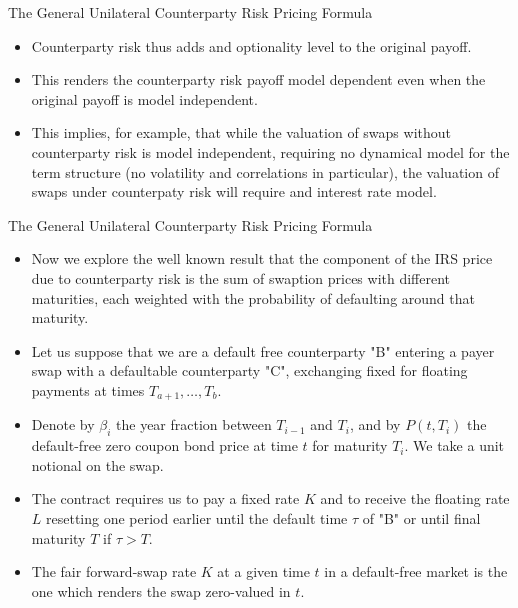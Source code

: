 \documentclass[11pt]{beamer}
\begin{document}
\begin{frame}{The General Unilateral Counterparty Risk Pricing Formula}
\begin{itemize}
\item Counterparty risk thus adds and optionality level to the original payoff. 
\item This renders the counterparty risk payoff model dependent even when the original payoff is model independent. \item This implies, for example, that while the valuation of swaps without counterparty risk is model independent, requiring no dynamical model for the term structure (no volatility and correlations in particular), the valuation of swaps under counterpaty risk will require and interest rate model. 
\end{itemize}
\end{frame}
\begin{frame}{The General Unilateral Counterparty Risk Pricing Formula}
\begin{itemize}
\item Now we explore the well known result that the component of the IRS price due to counterparty risk is the sum of swaption prices with different maturities, each weighted with the probability of defaulting around that maturity. 
\item Let us suppose that we are a default free counterparty "B" entering a payer swap with a defaultable counterparty "C", exchanging fixed for floating payments at times $T_{a+1},\dots,T_b$. 
\item Denote by $\beta_i$ the year fraction between $T_{i-1}$ and $T_i$, and by $P(t, T_i)$ the default-free zero coupon bond price at time $t$ for maturity $T_i$. We take a unit notional on the swap. 
\item The contract requires us to pay a fixed rate $K$ and to receive the floating rate $L$ resetting one period earlier until the default time $\tau$ of "B" or until final maturity $T$ if $\tau > T$. 
\item The fair forward-swap rate $K$ at a given time $t$ in a default-free market is the one which renders the swap zero-valued in $t$. 
\end{itemize}
\end{frame}
\end{document}
